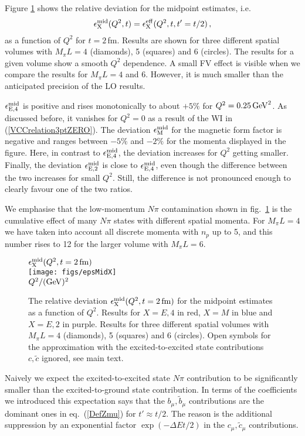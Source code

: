 \documentclass[11pt,prd,aps,showpacs,eqsecnum,floatfix,nofootinbib,preprint,tightenlines]{revtex4}
\newcommand{\bea}{\begin{eqnarray}}
\newcommand{\eea}{\end{eqnarray}}
\newcommand{\pref}[1]{(\ref{#1})}
\newcommand{\eV}[1]{\epsilon^{\rm mid}_{{\rm E},{#1}}}
\newcommand{\eM}{\epsilon^{\rm mid}_{\rm M}}
\begin{document}
Figure \ref{fig:epsMid} shows the relative deviation for the midpoint estimates, i.e.
\bea
\epsilon^{\rm mid}_{\rm X}(Q^2,t)=\epsilon^{\rm eff}_{\rm X}(Q^2,t,t'=t/2)\,,
\eea
 as a function of $Q^2$ for $t=2\,$fm. Results are shown for three different spatial volumes with $M_{\pi}L=4$ (diamonds), 5 (squares) and 6 (circles). The results for a given volume show a smooth $Q^2$ dependence. A small FV effect is visible when we compare the results for $M_{\pi}L=4$ and $6$. However, it is much smaller than the anticipated precision of the LO results.

$\eV{4}$ is positive and rises monotonically to about $+5\%$ for $Q^2=0.25\,{\rm GeV}^2$. As discussed before, it vanishes for $Q^2=0$ as a result of the WI in \pref{VCCrelation3ptZERO}. The deviation $\eM$ for the magnetic form factor is negative and ranges between $-5\%$ and $-2\%$ for the momenta displayed in the figure. Here, in contrast to $\eV{4}$, the deviation increases for $Q^2$ getting smaller. 
Finally, the deviation $\eV{2}$ is close to $\eV{4}$, even though the difference between the two increases for small $Q^2$. Still, the difference is not pronounced enough to clearly favour one of the two ratios.

We emphasise that the low-momentum $N\pi$ contamination shown in fig.\ \ref{fig:epsMid} is the cumulative effect of many $N\pi$ states with different spatial momenta. For $M_{\pi}L=4$ we have taken into account all discrete momenta with $n_p$ up to 5, and this number rises to 12 for the larger volume with $M_{\pi}L=6$.

% 
\begin{figure}[t]
$\epsilon^{\rm mid}_{\rm X}(Q^2,t=2\,{\rm fm})$\\
\texttt{[image: figs/epsMidX]}\\[0.3ex]
$Q^2/({\rm GeV})^2$\\[2ex]
\caption{The relative deviation $\epsilon^{\rm mid}_{\rm X}(Q^2,t=2\,{\rm fm})$ for the midpoint estimates as a function of $Q^2$. Results for $X=E,4$ in red, $X=M$ in blue and $X=E,2$ in purple. Results for three different spatial volumes with $M_{\pi}L=4$ (diamonds), 5 (squares) and 6 (circles). Open symbols for the approximation with the excited-to-excited state contributions $c,\tilde{c}$ ignored, see main text.}
\label{fig:epsMid}
\end{figure}

Naively we expect the excited-to-excited state $N\pi$ contribution to be significantly smaller than the excited-to-ground state contribution. 
In terms of the coefficients we introduced this expectation says that the $b_\mu,\tilde{b}_\mu$ contributions are the dominant ones in eq.\ \pref{DefZmu} for $t'\approx t/2$. 
The reason is the additional suppression by an exponential factor $\exp(-\Delta E t/2)$ in the  $c_{\mu}, \tilde{c}_{\mu}$ contributions. 
\end{document}
